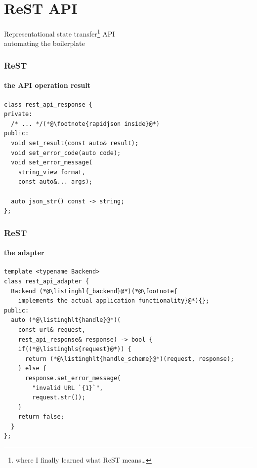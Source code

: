 \documentclass[compress,table,xcolor=table]{beamer}
\begin{document}
\section{ReST API}
\begin{frame}[c]
  \Huge
  \centering
  Representational state transfer\footnote{where I finally learned what ReST means\ldots} API\\
  \Large
  automating the boilerplate
  
\end{frame}
\begin{frame}[fragile]
  \frametitle{ReST}
  \framesubtitle{the API operation result}
  \begin{lstlisting}[language=c++2x,basicstyle=\normalsize\ttfamily]
class rest_api_response {
private:
  /* ... */(*@\footnote{rapidjson inside}@*)
public:
  void set_result(const auto& result);
  void set_error_code(auto code);
  void set_error_message(
    string_view format,
    const auto&... args);

  auto json_str() const -> string;
};
  \end{lstlisting}
\end{frame}
\begin{frame}[fragile]
  \frametitle{ReST}
  \framesubtitle{the adapter}
  \begin{lstlisting}[language=c++2x,basicstyle=\small\ttfamily]
template <typename Backend>
class rest_api_adapter {
  Backend (*@\listinghl{_backend}@*)(*@\footnote{
    implements the actual application functionality}@*){};
public:
  auto (*@\listinghlt{handle}@*)(
    const url& request,
    rest_api_response& response) -> bool {
    if((*@\listinghls{request}@*)) {
      return (*@\listinghlt{handle_scheme}@*)(request, response);
    } else {
      response.set_error_message(
        "invalid URL `{1}`",
        request.str());
    }
    return false;
  }
};
  \end{lstlisting}
\end{frame}
\end{document}
